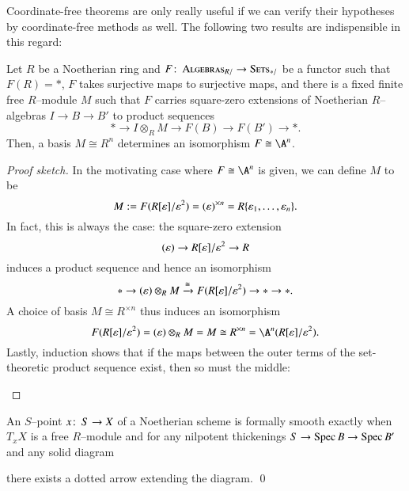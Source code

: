 Coordinate-free theorems are only really useful if we can verify their hypotheses by coordinate-free methods as well.  The following two results are indispensible in this regard:
\begin{theorem}\label{DetectingFormalVarieties}
Let $R$ be a Noetherian ring and $F\colon\thinspace \normalfont\textsc{Algebras}_{R/} \to \normalfont\textsc{Sets}_{*/}$ be a functor such that $F(R) = *$, $F$ takes surjective maps to surjective maps, and there is a fixed finite free $R$--module $M$ such that $F$ carries square-zero extensions of Noetherian $R$--algebras $I \to B \to B'$ to product sequences \[* \to I \otimes_R M \to F(B) \to F(B') \to *.\]  Then, a basis $M \cong R^n$ determines an isomorphism $F \cong \A^n$.
\end{theorem}
\begin{proof}[Proof sketch]
In the motivating case where $F \cong \A^n$ is given, we can define $M$ to be \[M := F(R[\varepsilon] / \varepsilon^2) = (\varepsilon)^{\times n} = R\{\varepsilon_1, \ldots, \varepsilon_n\}.\]  In fact, this is always the case: the square-zero extension \[(\varepsilon) \to R[\varepsilon] / \varepsilon^2 \to R\] induces a product sequence and hence an isomorphism \[* \to (\varepsilon) \otimes_R M \xrightarrow{\cong} F(R[\varepsilon] / \varepsilon^2) \to * \to *.\]  A choice of basis $M \cong R^{\times n}$ thus induces an isomorphism \[F(R[\eps] / \eps^2) = (\eps) \otimes_R M = M \cong R^{\times n} = \A^n(R[\eps] / \eps^2).\]  Lastly, induction shows that if the maps between the outer terms of the set-theoretic product sequence exist, then so must the middle:
\begin{center}
\end{center}
\vspace{-\baselineskip}
\end{proof}

\begin{corollary}
An $S$--point $x\colon\thinspace S \to X$ of a Noetherian scheme is formally smooth exactly when $T_x X$ is a free $R$--module and for any nilpotent thickenings $S \to \operatorname{Spec} B \to \operatorname{Spec} B'$ and any solid diagram
\begin{center}
\end{center}
there exists a dotted arrow extending the diagram. \qed
\end{corollary}

